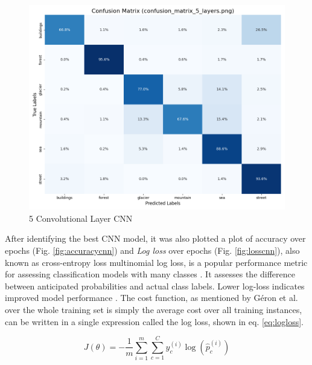 \documentclass[conference]{IEEEtran}
\begin{document}
\begin{figure}[ht]
    \centering
    \includegraphics[width=\linewidth]{img/confusion_matrix_5_layers.png}
    \caption{5 Convolutional Layer CNN}
    \label{fig:sub5}
\end{figure}


After identifying the best \ac{CNN} model, it was also plotted a plot of accuracy over epochs (Fig. \ref{fig:accuracycnn}) and \textit{Log loss} over epochs (Fig. \ref{fig:losscnn}),  also known as cross-entropy loss multinomial log loss, is a popular performance metric for assessing classification models with many classes \cite{loglosss}. It assesses the difference between anticipated probabilities and actual class labels. Lower log-loss indicates improved model performance \cite{logloss}. The cost function, as mentioned by Géron et al. \cite{b3} over the whole training set is simply the average cost over all training instances, can be written in a single expression called the log loss, shown in eq. \ref{eq:logloss}. 

\begin{equation}
    J(\theta) = -\frac{1}{m} \sum_{i=1}^m \sum_{c=1}^C y^{(i)}_c \log\left(\hat{p}^{(i)}_c\right)
    \label{eq:logloss}
\end{equation}
\end{document}
